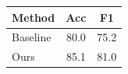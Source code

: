 \begin{tabular}{lcc}
\toprule
Method & Acc & F1 \\
\midrule
Baseline & 80.0 & 75.2 \\
Ours & 85.1 & 81.0 \\
\bottomrule
\end{tabular}
